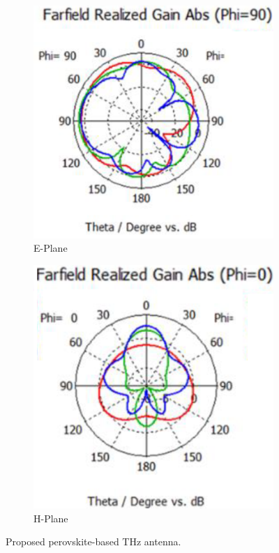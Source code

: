 \documentclass[12pt]{suhbook}
\begin{document}
\begin{figure}[hbt!]
\begin{subfigure}{.45\textwidth}
\centering
\includegraphics[width=0.9\linewidth]{20}
\caption{E-Plane}
\label{fig:sfig15a}
\end{subfigure}%
\begin{subfigure}{.45\textwidth}
  \centering
  \includegraphics[width=0.9\linewidth]{21}
  \caption{H-Plane}
  \label{fig:sfigb15}
\end{subfigure}
\caption{Proposed perovskite-based THz antenna.}
\label{fig:fig 15}
\end{figure}
% 
\end{document}
